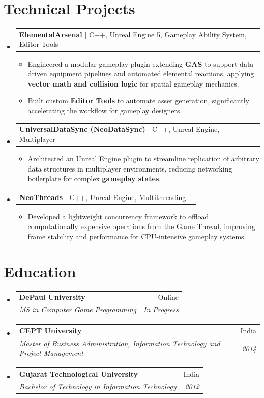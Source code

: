 \documentclass[letterpaper,11pt]{article}
\makeatletter
\newcommand{\resumeItem}[1]{
	\item\small{
		{#1 \vspace{-2pt}}
	}
}
\newcommand{\resumeSubheading}[4]{
	\vspace{-2pt}\item
	\begin{tabular*}{0.97\textwidth}[t]{l@{\extracolsep{\fill}}r}
		\textbf{#1} & #2 \\
		\textit{\small#3} & \textit{\small #4} \\
	\end{tabular*}\vspace{-7pt}
}
\newcommand{\resumeProjectHeading}[2]{
	\item
	\begin{tabular*}{0.97\textwidth}{l@{\extracolsep{\fill}}r}
		\small#1 & #2 \\
	\end{tabular*}\vspace{-7pt}
}
\newcommand{\resumeSubHeadingListStart}{\begin{itemize}[leftmargin=0.15in, label={}]}
\newcommand{\resumeSubHeadingListEnd}{\end{itemize}}
\newcommand{\resumeItemListStart}{\begin{itemize}}
\newcommand{\resumeItemListEnd}{\end{itemize}\vspace{-5pt}}
\makeatother
\begin{document}
	\section*{Technical Projects}
	\resumeSubHeadingListStart
	\resumeProjectHeading
	{\textbf{ElementalArsenal} $|$ \small{C++, Unreal Engine 5, Gameplay Ability System, Editor Tools}}{}
	\resumeItemListStart
	\resumeItem{Engineered a modular gameplay plugin extending \textbf{GAS} to support data-driven equipment pipelines and automated elemental reactions, applying \textbf{vector math and collision logic} for spatial gameplay mechanics.}
	\resumeItem{Built custom \textbf{Editor Tools} to automate asset generation, significantly accelerating the workflow for gameplay designers.}
	\resumeItemListEnd
	\resumeProjectHeading
	{\textbf{UniversalDataSync (NeoDataSync)} $|$ \small{C++, Unreal Engine, Multiplayer}}{}
	\resumeItemListStart
	\resumeItem{Architected an Unreal Engine plugin to streamline replication of arbitrary data structures in multiplayer environments, reducing networking boilerplate for complex \textbf{gameplay states}.}
	\resumeItemListEnd
	\resumeProjectHeading
	{\textbf{NeoThreads} $|$ \small{C++, Unreal Engine, Multithreading}}{}
	\resumeItemListStart
	\resumeItem{Developed a lightweight concurrency framework to offload computationally expensive operations from the Game Thread, improving frame stability and performance for CPU-intensive gameplay systems.}
	\resumeItemListEnd
	\resumeSubHeadingListEnd
	
	\section*{Education}
	\resumeSubHeadingListStart
	\resumeSubheading
	{DePaul University}{Online}
	{MS in Computer Game Programming}{In Progress}
	\resumeSubheading
	{CEPT University}{India}
	{Master of Business Administration, Information Technology and Project Management}{2014}
	\resumeSubheading
	{Gujarat Technological University}{India}
	{Bachelor of Technology in Information Technology}{2012}
	\resumeSubHeadingListEnd
\end{document}
